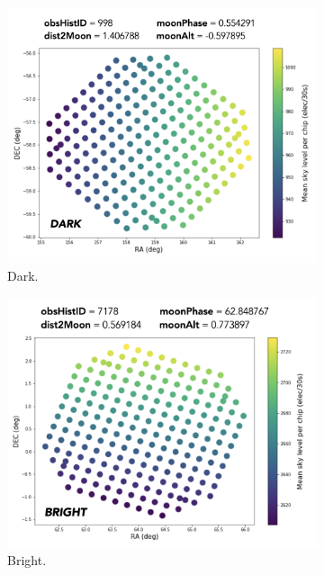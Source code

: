 \begin{figure}
\centering
\begin{subfigure}[b]{.32\textwidth}
  \centering
  \includegraphics[width=\textwidth]{images/sensors/skymodel_dark.jpg}
  \caption{Dark.}
  \label{fig:sub1}
\end{subfigure}%
\begin{subfigure}[b]{.32\textwidth}
  \centering
  \includegraphics[width=\textwidth]{images/sensors/skymodel_bright1.jpg}
  \caption{Bright.}
  \label{fig:sub2}
\end{subfigure}
\begin{subfigure}[b]{.32\textwidth}

\end{subfigure}
\end{figure}
